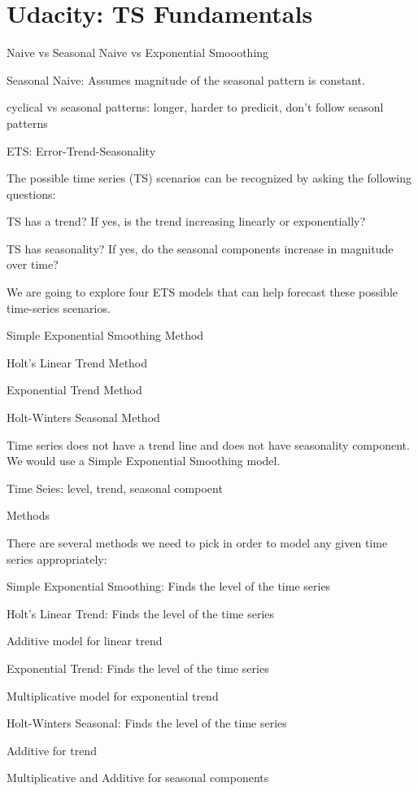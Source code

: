 \documentclass[]{book}
\theoremstyle{definition}
\theoremstyle{definition}
\theoremstyle{definition}
\theoremstyle{remark}
\begin{document}
\chapter{Udacity: TS Fundamentals}\label{udacity-ts-fundamentals}

Naive vs Seasonal Naive vs Exponential Smooothing

Seasonal Naive: Assumes magnitude of the seasonal pattern is constant.

cyclical vs seasonal patterns: longer, harder to predicit, don't follow
seasonl patterns

ETS: Error-Trend-Seasonality

The possible time series (TS) scenarios can be recognized by asking the
following questions:

TS has a trend? If yes, is the trend increasing linearly or
exponentially?

TS has seasonality? If yes, do the seasonal components increase in
magnitude over time?

We are going to explore four ETS models that can help forecast these
possible time-series scenarios.

Simple Exponential Smoothing Method

Holt's Linear Trend Method

Exponential Trend Method

Holt-Winters Seasonal Method

Time series does not have a trend line and does not have seasonality
component. We would use a Simple Exponential Smoothing model.

Time Seies: level, trend, seasonal compoent

Methods

There are several methods we need to pick in order to model any given
time series appropriately:

Simple Exponential Smoothing: Finds the level of the time series

Holt's Linear Trend: Finds the level of the time series

Additive model for linear trend

Exponential Trend: Finds the level of the time series

Multiplicative model for exponential trend

Holt-Winters Seasonal: Finds the level of the time series

Additive for trend

Multiplicative and Additive for seasonal components
\end{document}
